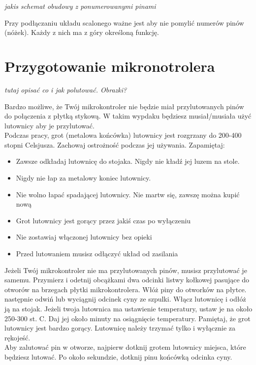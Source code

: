 \documentclass{pdfBooklets}
\begin{document}
\textit{jakis schemat obudowy z ponumerowanymi pinami}

Przy podłączaniu układu scalonego ważne jest aby nie pomylić numerów pinów (nóżek). Każdy z nich ma z góry określoną funkcję.



\section{Przygotowanie mikronotrolera}
\textit{tutaj opisać co i jak polutować. Obrazki?}
\begin{ProTip}{}
  Bardzo możliwe, że Twój mikrokontroler nie będzie miał przylutowanych pinów do połączenia z płytką stykową.
  W takim wypdaku będziesz musiał/musiała użyć lutownicy aby je przylutować.\\
  Podczas pracy, grot (metalowa końcówka) lutownicy jest rozgrzany do 200-400 stopni Celsjusza. Zachowaj ostrożność
  podczas jej używania. Zapamiętaj:
  \begin{itemize}
  \item Zawsze odkładaj lutownicę do stojaka. Nigdy nie kładź jej luzem na stole.
  \item Nigdy nie łap za metalowy koniec lutownicy.
  \item Nie wolno łapać spadającej lutownicy. Nie martw się, zawszę można kupić nową
  \item Grot lutownicy jest gorący przez jakiś czas po wyłączeniu
  \item Nie zostawiaj włączonej lutownicy bez opieki
  \item Przed lutowaniem musisz odłączyć układ od zasilania
  \end{itemize}
\end{ProTip}

Jeżeli Twój mikrokontroler nie ma przylutowanych pinów, musisz przylutować je samemu. Przymierz i odetnij
obcążkami dwa odcinki listwy kołkowej pasujące do otworów na brzegach płytki mikrokontrolera. Włóż piny do otworków
na płytce. następnie odwiń lub wyciągnij odcinek cyny ze szpulki. Włącz lutownicę i odłóż ją na stojak. Jeżeli twoja lutownica
ma ustawienie temperatury, ustaw je na około 250-300 st. C. Daj jej około minuty na osiągnięcie temperatury. Pamiętaj, że grot
lutownicy jest bardzo gorący. Lutownicę należy trzymać tylko i wyłącznie za rękojeść.
\\

Aby zalutować pin w otworze, najpierw dotknij grotem lutownicy
miejsca, które będziesz lutować. Po około sekundzie, dotknij pinu końcówką odcinka cyny.
\\
\end{document}
